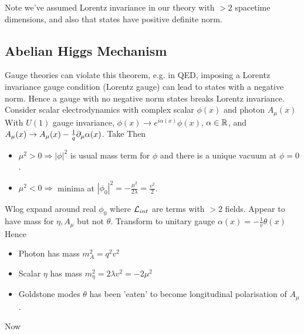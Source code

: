 \documentclass{article}
\begin{document}
Note we've assumed Lorentz invariance in our theory with $>2$ spacetime dimensions, and also that states have positive definite norm. 

\subsection{Abelian Higgs Mechanism}
Gauge theories can violate this theorem, e.g. in QED, imposing a Lorentz invariance gauge condition (Lorentz gauge) can lead to states with a negative norm. Hence a gauge with no negative norm states breaks Lorentz invariance. \\

Consider scalar electrodynamics with complex scalar $\phi(x)$ and photon $A_\mu(x)$ 
With $U(1)$ gauge invariance, $\phi(x) \to e^{i\alpha(x)}\phi(x)$, $\alpha\in\mathbb{R}$, and $A_\mu(x) \to A_\mu(x) - \frac{1}{q} \partial_\mu \alpha(x)$. Take 
Then 

\begin{itemize}
    \item $\mu^2 > 0 \Rightarrow |\phi|^2$ is usual mass term for $\phi$ and there is a unique vacuum at $\phi=0$. 
    \item $\mu^2 < 0 \Rightarrow $ minima at $|\phi_0|^2=-\frac{\mu^2}{2\lambda} = \frac{v^2}{2}$. 
\end{itemize}
Wlog expand around real $\phi_0$ 
where $\mathcal{L}_{int}$ are terms with $>2$ fields. Appear to have mass for $\eta,A_\mu$ but not $\theta$. Transform to unitary gauge $\alpha(x) = -\frac{1}{v} \theta(x) $
Hence 
\begin{itemize}
    \item Photon has mass $m_A^2 = q^2 v^2$ 
    \item Scalar $\eta$ has mass $m_\eta^2 = 2\lambda v^2 = -2\mu^2$ 
    \item Goldstone modes $\theta$ has been 'eaten' to become longitudinal polarisation of $A_\mu$. 
\end{itemize}
Now 
\end{document}
